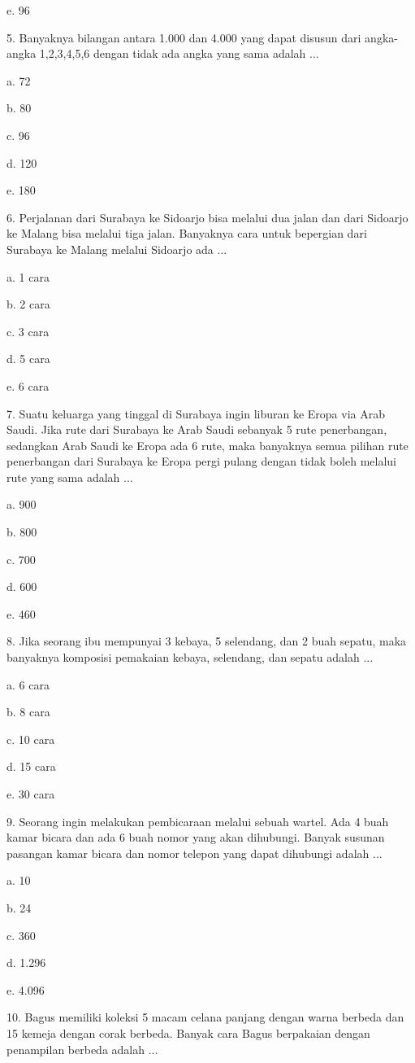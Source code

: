 \documentclass[11pt,fleqn]{book} %
\begin{document}
e.	96


5. Banyaknya bilangan antara 1.000 dan 4.000 yang dapat disusun dari angka-angka 1,2,3,4,5,6 dengan tidak ada angka yang sama adalah ... 

a.	72

b.	80

c.	96

d.	120

e.	180


6. Perjalanan dari Surabaya ke Sidoarjo bisa melalui dua jalan dan dari Sidoarjo ke Malang bisa melalui tiga jalan. Banyaknya cara untuk bepergian dari Surabaya ke Malang melalui Sidoarjo ada ... 

a.	1 cara

b.	2 cara

c.	3 cara

d.	5 cara

e.	6 cara


7. Suatu keluarga yang tinggal di Surabaya ingin liburan ke Eropa via Arab Saudi. Jika rute dari Surabaya ke Arab Saudi sebanyak 5 rute penerbangan, sedangkan Arab Saudi ke Eropa ada 6 rute, maka banyaknya semua pilihan rute penerbangan dari Surabaya ke Eropa pergi pulang dengan tidak boleh melalui rute yang sama adalah ... 

a.	900

b.	800

c.	700

d.	600

e.	460


8. Jika seorang ibu mempunyai 3 kebaya, 5 selendang, dan 2 buah sepatu, maka banyaknya komposisi pemakaian kebaya, selendang, dan sepatu adalah ... 

a.	6 cara

b.	8 cara

c.	10 cara

d.	15 cara

e.	30 cara

9. Seorang ingin melakukan pembicaraan melalui sebuah wartel. Ada 4 buah kamar bicara dan ada 6 buah nomor yang akan dihubungi. Banyak susunan pasangan kamar bicara dan nomor telepon yang dapat dihubungi adalah ... 

a.	10

b.	24

c.	360

d.	1.296

e.	4.096

10. Bagus memiliki koleksi 5 macam celana panjang dengan warna berbeda dan 15 kemeja dengan corak berbeda. Banyak cara Bagus berpakaian dengan penampilan berbeda adalah ... 
\end{document}
